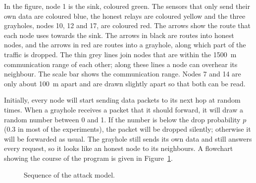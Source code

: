 \documentclass[conference]{IEEEtran}
\begin{document}
In the figure, node 1 is the sink, coloured green. The sensors that only send their own data are coloured blue, the honest relays are coloured yellow and the three grayholes, nodes 10, 12 and 17, are coloured red. The arrows show the route that each node uses towards the sink. The arrows in black are routes into honest nodes, and the arrows in red are routes into a grayhole, along which part of the traffic is dropped. The thin grey lines join nodes that are within the 1500~m communication range of each other; along these lines a node can overhear its neighbour. The scale bar shows the communication range. Nodes 7 and 14 are only about 100~m apart and are drawn slightly apart so that both can be read.

Initially, every node will start sending data packets to its next hop at random times. When a grayhole receives a packet that it should forward, it will draw a random number between 0 and 1. If the number is below the drop probability $p$ (0.3 in most of the experiments), the packet will be dropped silently; otherwise it will be forwarded as usual. The grayhole still sends its own data and still answers every request, so it looks like an honest node to its neighbours. A flowchart showing the course of the program is given in Figure~\ref{fig:attackflow}.

\begin{figure}[t]\centering
{}
\caption{Sequence of the attack model.}\label{fig:attackflow}
\end{figure}
\end{document}
